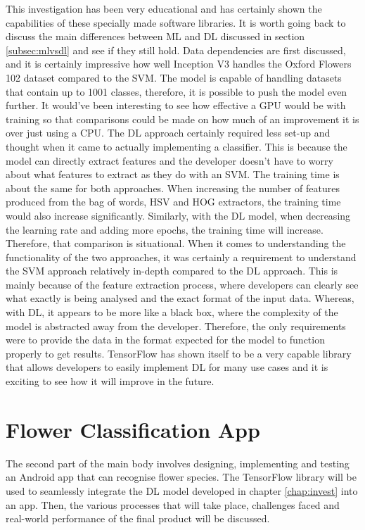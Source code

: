 \documentclass[12pt,a4paper]{report}
\begin{document}
This investigation has been very educational and has certainly shown the capabilities of these specially made software 
libraries. It is worth going back to discuss the main differences between ML and DL discussed in section \ref{subsec:mlvsdl}
and see if they 
still hold. Data dependencies are first discussed, and it is certainly impressive how well Inception V3 handles the 
Oxford Flowers 102 dataset compared to the SVM. The model is capable of handling datasets that contain up to 1001 
classes, therefore, it is possible to push the model even further. It would've been interesting to see how effective a 
GPU would be with training so that comparisons could be made on how much of an improvement it is over just using a CPU. 
The DL approach certainly required less set-up and thought when it came to actually implementing a classifier. This is 
because the model can directly extract features and the developer doesn't have to worry about what features to extract 
as they do with an SVM. The training time is about the same for both approaches. When increasing the number of 
features produced from the bag of words, HSV and HOG extractors, the training time would also increase significantly. 
Similarly, with the DL model, when decreasing the learning rate and adding more epochs, the training time will increase.
Therefore, that comparison is situational. When it comes to understanding the functionality of the two approaches, it 
was certainly a requirement to understand the SVM approach relatively in-depth compared to the DL approach. This is 
mainly because of the feature extraction process, where developers can clearly see what exactly is being analysed and 
the exact format of the input data. Whereas, with DL, it appears to be more like a black box, where the complexity of 
the model is abstracted away from the developer. Therefore, the only requirements were to provide the data in the format
expected for the model to function properly to get results. TensorFlow has shown itself to be a 
very capable library that allows developers to easily implement DL for many use cases and it is exciting to see
how it will improve in the future. 


\clearpage

\chapter{Flower Classification App}

The second part of the main body involves designing, implementing and testing an Android app that can recognise flower
species. The TensorFlow library will be used to seamlessly integrate the DL model developed in chapter
\ref{chap:invest} into an app. Then, the various processes that will take place, challenges faced and real-world 
performance of the final product will be discussed.
\end{document}
